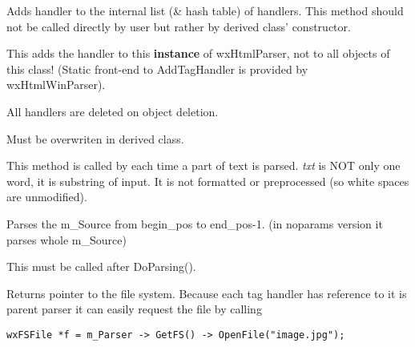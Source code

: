 \label{wxhtmlparseraddtaghandler}


Adds handler to the internal list (\& hash table) of handlers. This
method should not be called directly by user but rather by derived class'
constructor.

This adds the handler to this {\bf instance} of wxHtmlParser, not to
all objects of this class! (Static front-end to AddTagHandler is provided
by wxHtmlWinParser).

All handlers are deleted on object deletion.

\label{wxhtmlparseraddword}


Must be overwriten in derived class.

This method is called by 
each time a part of text is parsed. {\it txt} is NOT only one word, it is
substring of input. It is not formatted or preprocessed (so white spaces are
unmodified).

\label{wxhtmlparserdoparsing}



Parses the m\_Source from begin\_pos to end\_pos-1.
(in noparams version it parses whole m\_Source)

\label{wxhtmlparserdoneparser}


This must be called after DoParsing().

\label{wxhtmlparsergetfs}


Returns pointer to the file system. Because each tag handler has
reference to it is parent parser it can easily request the file by
calling

\begin{verbatim}
wxFSFile *f = m_Parser -> GetFS() -> OpenFile("image.jpg");
\end{verbatim}

\label{wxhtmlparsergetproduct}

